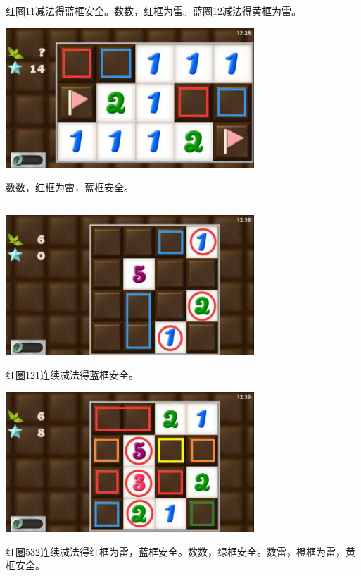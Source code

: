 红圈11减法得蓝框安全。数数，红框为雷。蓝圈12减法得黄框为雷。
\begin{center}
    \includegraphics[width=0.7\textwidth]{puzzlelow/85-5.jpg}
\end{center}
数数，红框为雷，蓝框安全。

\subsection{} %
\begin{center}
    \includegraphics[width=0.7\textwidth]{puzzlelow/86-1.jpg}
\end{center}
红圈121连续减法得蓝框安全。
\begin{center}
    \includegraphics[width=0.7\textwidth]{puzzlelow/86-2.jpg}
\end{center}
红圈532连续减法得红框为雷，蓝框安全。数数，绿框安全。数雷，橙框为雷，黄框安全。

